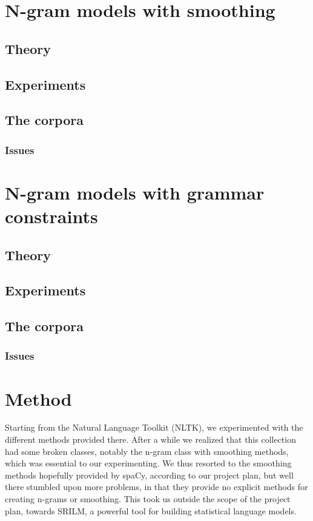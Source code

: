 \documentclass[a4paper,12pt]{article}
\begin{document}
\section{N-gram models with smoothing}
\label{sec:ngramsmoothing}

\subsection{Theory}
\subsection{Experiments}
\subsection{The corpora}
\subsubsection{Issues}

\section{N-gram models with grammar constraints}
\label{sec:ngramgrammar}

\subsection{Theory}
\subsection{Experiments}
\subsection{The corpora}
\subsubsection{Issues}


\section{Method}
\label{sec:method}

Starting from the Natural Language Toolkit (NLTK), we experimented with the different methods provided there. After a while we realized that this collection had some broken classes, notably the n-gram class with smoothing methods, which was essential to our experimenting. We thus resorted to the smoothing methods hopefully provided by spaCy, according to our project plan, but well there stumbled upon more problems, in that they provide no explicit methods for creating n-grams or smoothing. This took us outside the scope of the project plan, towards SRILM, a powerful tool for building statistical language models.
\end{document}

